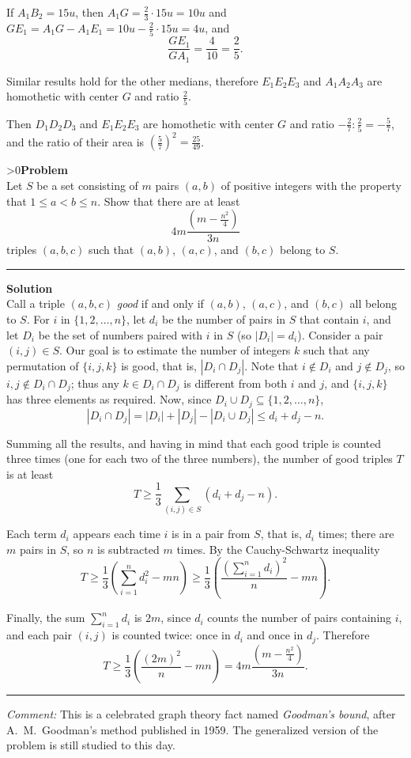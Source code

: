 \documentclass[12pt,oneside,a4paper]{book}
\newcounter{probnum}
\newcounter{solnum}
\newcommand{\prob}{\ifnum\value{probnum}>0\newpage\fi\setcounter{solnum}{0}\stepcounter{probnum}\textbf{Problem \theprobnum}\\}
\newcommand{\comment}{\medskip\hrule\medbreak\emph{Comment: }}
\newcommand{\sol}{\medskip\hrule\medbreak\textbf{Solution}\\}
\begin{document}
If $A_1B_2 = 15u$, then $A_1G = \frac23\cdot 15u = 10u$ and $GE_1 = A_1G - A_1E_1 = 10u - \frac25\cdot 15u = 4u$, and
\[\frac{GE_1}{GA_1} = \frac 4{10} = \frac25.\]

Similar results hold for the other medians, therefore $E_1E_2E_3$ and $A_1A_2A_3$ are homothetic with center $G$ and ratio $\frac25$.

Then $D_1D_2D_3$ and $E_1E_2E_3$ are homothetic with center $G$ and ratio $-\frac 27 : \frac25 = -\frac57$, and the ratio of their area is $\left(\frac 57\right)^2 = \frac{25}{49}$.

\prob Let $S$ be a set consisting of $m$ pairs $(a,b)$ of positive integers with the property that $1\le a<b\le n$. Show that there are at least
\[4m\frac{(m-\frac{n^2}4)}{3n}\]
triples $(a,b,c)$ such that $(a,b)$, $(a,c)$, and $(b,c)$ belong to $S$.

\sol
Call a triple $(a,b,c)$ \emph{good} if and only if $(a,b)$, $(a,c)$, and $(b,c)$ all belong to $S$. For $i$ in $\{1,2,\ldots,n\}$, let $d_i$ be the number of pairs in $S$ that contain $i$, and let $D_i$ be the set of numbers paired with $i$ in $S$ (so $|D_i| = d_i$). Consider a pair $(i,j)\in S$. Our goal is to estimate the number of integers $k$ such that any permutation of $\{i,j,k\}$ is good, that is, $|D_i\cap D_j|$. Note that $i\notin D_i$ and $j\notin D_j$, so $i,j\notin D_i\cap D_j$; thus any $k\in D_i\cap D_j$ is different from both $i$ and $j$, and $\{i,j,k\}$ has three elements as required. Now, since $D_i\cup D_j \subseteq \{1,2,\ldots,n\}$,
\[|D_i\cap D_j| = |D_i| + |D_j| - |D_i\cup D_j| \le d_i + d_j - n.\]

Summing all the results, and having in mind that each good triple is counted three times (one for each two of the three numbers), the number of good triples $T$ is at least
\[T \ge \frac 13\sum_{(i,j)\in S}(d_i+d_j-n).\]

Each term $d_i$ appears each time $i$ is in a pair from $S$, that is, $d_i$ times; there are $m$ pairs in $S$, so $n$ is subtracted $m$ times. By the Cauchy-Schwartz inequality
\[T \ge \frac13\left(\sum_{i=1}^n d_i^2 - mn\right) \ge \frac13\left(\frac{\left(\sum_{i=1}^n d_i\right)^2}n - mn\right).\]

Finally, the sum $\sum_{i=1}^n d_i$ is $2m$, since $d_i$ counts the number of pairs containing $i$, and each pair $(i,j)$ is counted twice: once in $d_i$ and once in $d_j$. Therefore
\[T \ge \frac13\left(\frac{(2m)^2}n - mn\right) = 4m\frac{(m-\frac{n^2}4)}{3n}.\]

\comment
This is a celebrated graph theory fact named \emph{Goodman's bound}, after A.~M.~Goodman's method published in 1959. The generalized version of the problem is still studied to this day.
\end{document}
